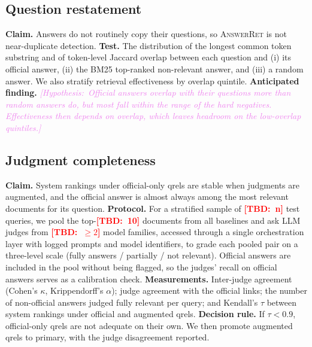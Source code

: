 \documentclass[runningheads]{llncs}
\newcommand{\TBD}[1]{\textcolor{red}{\textbf{[TBD:~#1]}}}
\newcommand{\HYP}[1]{\textcolor{violet}{\textit{[Hypothesis:~#1]}}}
\newcommand{\TBD}[1]{\errmessage{Unresolved TBD: #1}}
\newcommand{\HYP}[1]{#1}
\newcommand{\taskA}{\textsc{AnswerRet}}
\begin{document}
\begin{table}[t]
\caption{Shortcut audit (\taskA{}, test split). Rates are the percentage of
answers containing the feature; retrieval scores are MRR@10.}
\label{tab:shortcuts}
\centering

\end{table}

\subsection{Question restatement}
\textbf{Claim.} Answers do not routinely copy their questions, so \taskA{} is
not near-duplicate detection.
\textbf{Test.} The distribution of the longest common token substring and of
token-level Jaccard overlap between each question and (i) its official answer,
(ii) the BM25 top-ranked non-relevant answer, and (iii) a random answer.
We also stratify retrieval effectiveness by overlap quintile.
\textbf{Anticipated finding.} \HYP{Official answers overlap with their questions
more than random answers do, but most fall within the range of the hard
negatives. Effectiveness then depends on overlap, which leaves headroom on the
low-overlap quintiles.}

\subsection{Judgment completeness}\label{sec:completeness}
\textbf{Claim.} System rankings under official-only qrels are stable when
judgments are augmented, and the official answer is almost always among the
most relevant documents for its question.
\textbf{Protocol.} For a stratified sample of \TBD{n} test queries, we pool the
top-\TBD{10} documents from all baselines and ask LLM judges from
\TBD{$\geq2$} model families, accessed through a single orchestration layer
with logged prompts and model identifiers, to grade each pooled pair on a
three-level scale (fully answers / partially / not relevant). Official answers
are included in the pool without being flagged, so the judges' recall on
official answers serves as a calibration check.
\textbf{Measurements.} Inter-judge agreement (Cohen's $\kappa$, Krippendorff's
$\alpha$); judge agreement with the official links; the number of
non-official answers judged fully relevant per query; and Kendall's $\tau$
between system rankings under official and augmented qrels.
\textbf{Decision rule.} If $\tau<0.9$, official-only qrels are not adequate
on their own. We then promote augmented qrels to primary, with the judge
disagreement reported.
\end{document}
